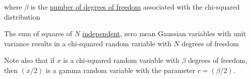 \documentclass[fleqn]{article}
\begin{document}
\begin{enumerate}
		where $\beta$ is the \underline{number of degrees of freedom} associated with the chi-squared distribution
		
		The sum of squares of $N$ \underline{independent}, zero mean Gaussian variables with unit variance results in a chi-squared random variable with $N$ degrees of freedom
		
		Note also that if $x$ is a chi-squared random variable with $\beta$ degrees of freedom, then $(x/2)$ is a gamma random variable with the parameter \newline $c = (\beta/2)$.

	\end{enumerate}
\end{document}
